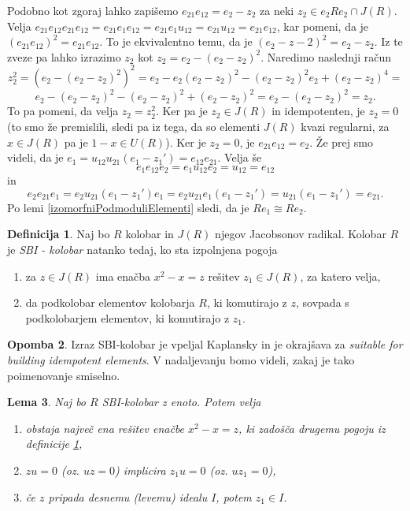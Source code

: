 \documentclass[a4paper, 12pt]{amsart}
\theoremstyle{definition} %
\newtheorem{definicija}{Definicija}[section]
\newtheorem{opomba}[definicija]{Opomba}
\theoremstyle{plain} %
\newtheorem{lema}[definicija]{Lema}
\begin{document}
Podobno kot zgoraj lahko zapišemo $e_{21} e_{12} = e_2 - z_2 $ za neki $z_2 \in e_2 Re_2 \cap J(R)$. Velja $e_{21}e_{12}e_{21}e_{12} = e_{21} e_1 e_{12} = e_{21} e_1 u_{12} = e_{21} u_{12} = e_{21} e_{12}$, kar pomeni, da je $(e_{21} e_{12})^2 = e_{21} e_{12}$. To je ekvivalentno temu, da je $(e_2 - z-2 )^2 = e_2 - z_2$. Iz te zveze pa lahko izrazimo $z_2$ kot $z_2 = e_2 - (e_2 - z_2)^2$. Naredimo naslednji račun
$$
z_2^2 = (e_2 - (e_2 - z_2)^2)^2 = e_2 - e_2(e_2-z_2)^2 - (e_2 - z_2 )^2 e_2 + (e_2 - z_2 )^4 = 
$$
$$
e_2 - (e_2 - z_2 )^2 - (e_2 - z_2)^2 + (e_2 - z_2)^2 = e_2 - (e_2 - z_2)^2 = z_2.
$$
To pa pomeni, da velja $z_2 = z_2^2$. Ker pa je $z_2\in J(R)$ in idempotenten, je $z_2 = 0$ (to smo že premislili, sledi pa iz tega, da so elementi $J(R)$ kvazi regularni, za $x\in J(R)$ pa je $1-x\in U(R)$). Ker je $z_2 = 0$, je $e_{21} e_{12} = e_2$. Že prej smo videli, da je $e_1 = u_{12}u_{21}(e_1 - z_1') = e_{12} e_{21}$. Velja še 
$$
e_1 e_{12}e_2 = e_1 u_{12} e_2 = u_{12} = e_{12}
$$
in
$$
e_2 e_{21} e_1 = e_2 u_{21}(e_1 - z_1') e_1 = e_2 u_{21} e_1 (e_1 - z_1') = u_{21}(e_1 - z_1') = e_{21}.
$$
Po lemi \ref{izomorfniPodmoduliElementi} sledi, da je $Re_1 \cong Re_2$.

\endproof

\begin{definicija}
\label{SBI-kolobar}
Naj bo $R$ kolobar in $J(R)$ njegov Jacobsonov radikal. Kolobar $R$ je \emph{SBI - kolobar} natanko tedaj, ko sta izpolnjena pogoja
\begin{enumerate}
\item za $z\in J(R)$ ima enačba $x^2 - x = z$ rešitev $z_1 \in J(R)$, za katero velja, 
\item da podkolobar elementov kolobarja $R$, ki komutirajo z $z$, sovpada s podkolobarjem elementov, ki komutirajo z $z_1$.  
\end{enumerate}
\end{definicija}

\begin{opomba}
Izraz SBI-kolobar je vpeljal Kaplansky in je okrajšava za \textit{suitable for building idempotent elements}. V nadaljevanju bomo videli, zakaj je tako poimenovanje smiselno.
\end{opomba}

\begin{lema}
\label{SBIlastnosti}
Naj bo $R$ SBI-kolobar z enoto. Potem velja
\begin{enumerate}
\item obstaja največ ena rešitev enačbe $x^2 - x = z$, ki zadošča drugemu pogoju iz definicije \ref{SBI-kolobar},
\item $zu = 0$ (oz. $uz = 0$) implicira  $z_1 u = 0$ (oz. $uz_1=0$),
\item če $z$ pripada desnemu (levemu) idealu $I$, potem $z_1\in I$.
\end{enumerate}
\end{lema}
\end{document}
